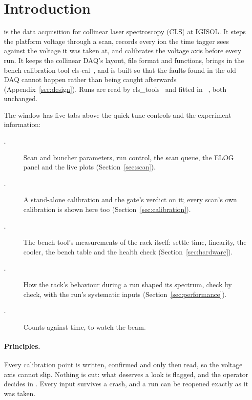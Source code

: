 \section{Introduction}
\label{sec:introduction}

\oracle{} is the data acquisition for collinear laser spectroscopy (CLS) at IGISOL. It steps
the platform voltage through a scan, records every ion the time tagger sees against the
voltage it was taken at, and calibrates the voltage axis before every run. It keeps the
collinear DAQ's layout, file format and functions, brings in the bench calibration tool
cls-cal~\cite{clscal}, and is built so that the faults found in the old DAQ cannot happen
rather than being caught afterwards (Appendix~\ref{sec:design}). Runs are read by
cls\_tools~\cite{clstools} and fitted in \denis{}~\cite{denis}, both unchanged.

The window has five tabs above the quick-tune controls and the experiment information:

\begin{description}
    \item[.] Scan and buncher parameters, run control, the scan queue,
        the ELOG panel and the live plots (Section~\ref{sec:scan}).
    \item[.] A stand-alone calibration and the gate's verdict on it;
        every scan's own calibration is shown here too (Section~\ref{sec:calibration}).
    \item[.] The bench tool's measurements of the rack itself:
        settle time, linearity, the cooler, the bench table and the health check
        (Section~\ref{sec:hardware}).
    \item[.] How the rack's behaviour during a run shaped its
        spectrum, check by check, with the run's systematic inputs
        (Section~\ref{sec:performance}).
    \item[.] Counts against time, to watch the beam.
\end{description}

\paragraph{Principles.}
Every calibration point is written, confirmed and only then read, so the voltage axis
cannot slip. Nothing is cut: what deserves a look is flagged, and the operator decides in
\denis{}. Every input survives a crash, and a run can be reopened exactly as it was taken.

